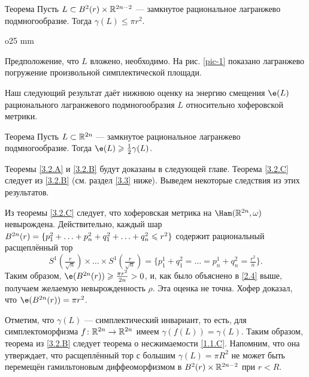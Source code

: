\begin{thm}[(\cite{S1})]{Теорема}\label{3.2.B}
Пусть $L \subset B^2 (r) \times \mathbb{R}^{2n - 2}$ --- замкнутое рациональное лагранжево подмногообразие.
Тогда $\gamma (L) \le \pi r^2$.
\end{thm}

\begin{wrapfigure}[6]{o}{25 mm}
\vskip-3mm
\centering
\caption{}\label{pic-1}
\vskip0mm
\end{wrapfigure}

Предположение, что $L$ вложено, необходимо.
На рис. \ref{pic-1} показано лагранжево погружение произвольной симплектической площади.

Наш следующий результат даёт нижнюю оценку на энергию смещения $\e (L)$ рационального лагранжевого подмногообразия $L$ относительно хоферовской метрики.


\begin{thm}{Теорема}\label{3.2.C}
Пусть $L \subset \mathbb{R}^{2n}$ --- замкнутое рациональное лагранжево подмногообразие.
Тогда $\e (L) \ge \tfrac12 \gamma (L)$.
\end{thm}

Теоремы \ref{3.2.A} и \ref{3.2.B} будут доказаны в следующей главе.
Теорема \ref{3.2.C} следует из \ref{3.2.B} (см. раздел \ref{3.3} ниже).
Выведем некоторые следствия из этих результатов.

\begin{thm}{}\label{3.2.D}
\end{thm}

Из теоремы \ref{3.2.C} следует, что хоферовская метрика на $\Ham (\RR^{2n}, \omega)$ невырождена.
Действительно, каждый шар 
$B^{2n}(r) = \{p_1^2 +\z\dots\z+ p_n^2 \z+ q_1^2+\z\dots\z+ q_n^2 \le r^2\}$
содержит рациональный расщеплённый тор 
\[
S^1(\tfrac r{\sqrt{n}}) \times\dots\times S^1(\tfrac r{\sqrt{n}})
=
\{p_1^1+q_1^2=\dots=p_n^1+q_n^2=\tfrac{r^2}{n}\}.
\]
Таким образом, $\e (B^{2n} (r)) \ge \tfrac{\pi r^2}{2n}> 0$, и, как было объяснено в \ref{2.4} выше, получаем желаемую невырожденность $\rho$.
Эта оценка не точна.
Хофер \cite{H1} доказал, что $\e (B^{2n} (r)) = \pi r^2$.

\begin{thm}{}\label{3.2.E} 
\end{thm}

Отметим, что $\gamma (L)$ --- симплектический инвариант, то есть, для симплектоморфизма $f\colon \mathbb{R}^{2n} \to \mathbb{R}^{2n}$ имеем $\gamma (f (L)) = \gamma (L)$.
Таким образом, теорема из \ref{3.2.B} следует теорема о несжимаемости \ref{1.1.C}.
Напомним, что она утверждает, что расщеплённый тор с большим $\gamma (L) = \pi R^2$ не может быть перемещён гамильтоновым диффеоморфизмом в $B^2 (r) \times \mathbb{R}^{2n - 2}$ при $r<R$.

